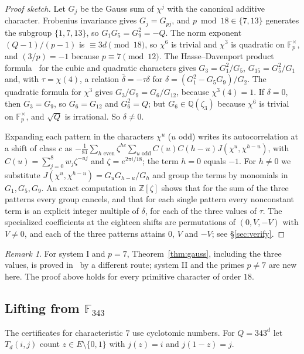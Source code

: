 \documentclass[11pt]{article}
\theoremstyle{plain}
\theoremstyle{definition}
\theoremstyle{remark}
\newtheorem{remark}[theorem]{Remark}
\newcommand{\F}{\mathbb F}
\newcommand{\Z}{\mathbb Z}
\newcommand{\Q}{\mathbb Q}
\begin{document}
\begin{proof}[Proof sketch]
Let $G_j$ be the Gauss sum of $\chi^j$ with the canonical additive character.
Frobenius invariance gives $G_j=G_{pj}$, and $p\bmod18\in\{7,13\}$ generates
the subgroup $\{1,7,13\}$, so $G_1G_5=G_9^2=-Q$. The norm exponent $(Q-1)/(p-1)$ is $\equiv3d\pmod{18}$, so
$\chi^6$ is trivial and $\chi^3$ is quadratic on $\F_p^\times$, and
$(3/p)=-1$ because $p\equiv7\pmod{12}$. The Hasse--Davenport product
formula~\cite[\S11.3]{BEW} for the cubic and quadratic characters gives
$G_3=G_1^2/G_5$, $G_{15}=G_5^2/G_1$ and, with $\tau=\chi(4)$, a relation
$\bar\delta=-\tau\delta$ for $\delta=(G_1^2-G_5G_9)/G_2$. The quadratic
formula for $\chi^3$ gives $G_3/G_9=G_6/G_{12}$, because $\chi^3(4)=1$. If
$\delta=0$, then $G_3=G_9$, so $G_6=G_{12}$ and $G_6^2=Q$;
but $G_6\in\Q(\zeta_3)$ because $\chi^6$ is trivial on $\F_p^\times$, and
$\sqrt Q$ is irrational. So $\delta\ne0$.

Expanding each pattern in the characters $\chi^u$ ($u$ odd) writes its
autocorrelation at a shift of class $c$ as
$-\tfrac1{81}\sum_{h\text{ even}}\zeta^{hc}\sum_{u\text{ odd}}
C(u)C(h-u)J(\chi^u,\chi^{h-u})$, with $C(u)=\sum_{j=0}^8w_j\zeta^{-uj}$
and $\zeta=e^{2\pi i/18}$; the term $h=0$ equals $-1$. For $h\ne0$ we
substitute $J(\chi^u,\chi^{h-u})=G_uG_{h-u}/G_h$ and group the terms by
monomials in $G_1,G_5,G_9$. An exact computation in $\Z[\zeta]$ shows that for the
sum of the three patterns every group cancels, and that for each single
pattern every nonconstant term is an explicit integer multiple of $\delta$,
for each of the three values of $\tau$. The specialized coefficients at the
eighteen shifts are permutations of $(0,V,-V)$ with $V\ne0$, and each of
the three patterns attains $0$, $V$ and $-V$; see \S\ref{sec:verify}.
\end{proof}

\begin{remark}
For system I and $p=7$, Theorem~\ref{thm:gauss}, including the three
values, is proved in~\cite{Kline18} by a different route; system II and the
primes $p\ne7$ are new here. The proof above holds
for every primitive character of order $18$.
\end{remark}

\subsection{\texorpdfstring{Lifting from $\F_{343}$}{Lifting from F343}}
The certificates for characteristic $7$ use cyclotomic numbers. For
$Q=343^d$ let $T_d(i,j)$ count $z\in E\setminus\{0,1\}$ with $j(z)=i$ and
$j(1-z)=j$.
\end{document}
